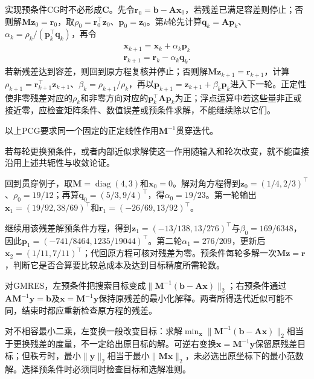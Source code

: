 实现预条件CG时不必形成$\bm C$。先令$\bm r_0=\bm b-\bm A\bm x_0$，若残差已满足容差则停止；否则解$\bm M\bm z_0=\bm r_0$，取$\rho_0=\bm r_0^\top\bm z_0$、$\bm p_0=\bm z_0$。第$k$轮先计算$\bm q_k=\bm A\bm p_k$、$\alpha_k=\rho_k/(\bm p_k^\top\bm q_k)$，再令
\[
 \begin{gathered}
\bm x_{k+1}=\bm x_k+\alpha_k\bm p_k\\
\bm r_{k+1}=\bm r_k-\alpha_k\bm q_k.
 \end{gathered}
\]
若新残差达到容差，则回到原方程复核并停止；否则解$\bm M\bm z_{k+1}=\bm r_{k+1}$，计算$\rho_{k+1}=\bm r_{k+1}^\top\bm z_{k+1}$、$\beta_k=\rho_{k+1}/\rho_k$，再以$\bm p_{k+1}=\bm z_{k+1}+\beta_k\bm p_k$进入下一轮。正定性使非零残差对应的$\rho_k$和非零方向对应的$\bm p_k^\top\bm A\bm p_k$为正；浮点运算中若这些量非正或接近零，应检查矩阵条件、数值误差或预条件求解，不能继续除以它们。

以上PCG要求同一个固定的正定线性作用$\bm M^{-1}$贯穿迭代。

若每轮更换预条件，或者内部近似求解使这一作用随输入和轮次改变，就不能直接沿用上述共轭性与收敛论证。

回到贯穿例子，取$\bm M=\operatorname{diag}(4,3)$和$\bm x_0=0$。解对角方程得到$\bm z_0=(1/4,2/3)^\top$、$\rho_0=19/12$；再算$\bm q_0=(5/3,9/4)^\top$，得$\alpha_0=19/23$。第一轮输出$\bm x_1=(19/92,38/69)^\top$和$\bm r_1=(-26/69,13/92)^\top$。

继续用该残差解预条件方程，得到$\bm z_1=(-13/138,13/276)^\top$与$\beta_0=169/6348$，因此$\bm p_1=(-741/8464,1235/19044)^\top$。第二轮$\alpha_1=276/209$，更新后$\bm x_2=(1/11,7/11)^\top$；代回原方程可核对残差为零。预条件每轮多解一次$\bm M\bm z=\bm r$，判断它是否合算要比较总成本及达到目标精度所需轮数。


对GMRES，左预条件把搜索目标变成$\lVert\bm M^{-1}(\bm b-\bm A\bm x)\rVert_2$；右预条件通过$\bm A\bm M^{-1}\bm y=\bm b$及$\bm x=\bm M^{-1}\bm y$保持原残差的最小化解释。两者所得迭代近似可能不同，结束时都应重新检查原方程的残差。

对不相容最小二乘，左变换一般改变目标：求解$\min_{\bm x}\lVert\bm M^{-1}(\bm b-\bm A\bm x)\rVert_2$相当于更换残差的度量，不一定给出原目标的解。可逆右变换$\bm x=\bm M^{-1}\bm y$保留原残差目标；但秩亏时，最小$\lVert\bm y\rVert_2$相当于最小$\lVert\bm M\bm x\rVert_2$，未必选出原坐标下的最小范数解。选择预条件时必须同时检查目标和选解准则。
